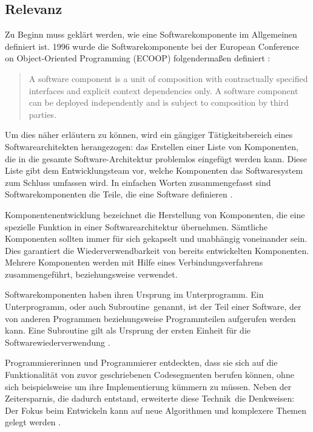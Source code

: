 \subsection{Relevanz}
\label{sec:1_Relevanz}

Zu Beginn muss geklärt werden, wie eine Softwarekomponente im Allgemeinen definiert ist. 1996 wurde die Softwarekomponente bei der European Conference on Object-Oriented Programming (ECOOP) folgendermaßen definiert \citereset \autocite[siehe][S. 35-47]{Szyperski.2002}:
\begin{quote}
\glqq A software component is a unit of composition with contractually specified interfaces and explicit context dependencies only. A software component can be deployed independently and is subject to composition by third parties.\grqq
\end{quote}
Um dies näher erläutern zu können, wird ein gängiger Tätigkeitsbereich eines Softwarearchitekten herangezogen: das Erstellen einer Liste von Komponenten, die in die gesamte Software-Architektur problemlos eingefügt werden kann. Diese Liste gibt dem Entwicklungsteam vor, welche Komponenten das Softwaresystem zum Schluss umfassen wird. In einfachen Worten zusammengefasst sind Softwarekomponenten die Teile, die eine Software definieren \citereset \autocite[siehe][S. 35-47]{Szyperski.2002}.

Komponentenentwicklung bezeichnet die Herstellung von Komponenten, die eine spezielle Funktion in einer Softwarearchitektur übernehmen. Sämtliche Komponenten sollten immer für sich gekapselt und unabhängig voneinander sein. Dies garantiert die Wiederverwendbarkeit von bereits entwickelten Komponenten. Mehrere Komponenten werden mit Hilfe eines Verbindungsverfahrens zusammengeführt, beziehungsweise verwendet.

Softwarekomponenten haben ihren Ursprung im \glqq Unterprogramm\grqq . Ein \glqq Unterprogramm\grqq , oder auch \glqq Subroutine\grqq\ genannt, ist der Teil einer Software, der von anderen Programmen beziehungsweise Programmteilen aufgerufen werden kann. Eine Subroutine gilt als Ursprung der ersten Einheit für die Softwarewiederverwendung \citereset \autocite[siehe][]{Wheeler.1985}.

Programmiererinnen und Programmierer entdeckten, dass sie sich auf die Funktionalität von zuvor geschriebenen Codesegmenten berufen können, ohne sich beispielsweise um ihre Implementierung kümmern zu müssen. Neben der Zeitersparnis, die dadurch entstand, erweiterte diese \glqq Technik\grqq\ die Denkweisen: Der Fokus beim Entwickeln kann auf neue Algorithmen und komplexere Themen gelegt werden \citereset \autocite[siehe][S. 3-12]{Szyperski.2002}.

